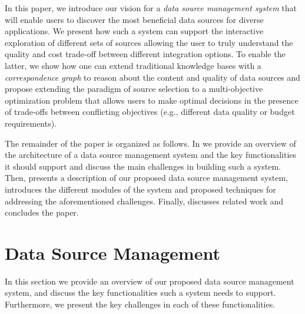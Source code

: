 \documentclass{sig-alternate}
\begin{document}
In this paper, we introduce our vision for a {\em data source management system} that will enable users to discover the most beneficial data sources for diverse applications. We present how such a system can support the interactive exploration of different sets of sources allowing the user to truly understand the quality and cost trade-off between different integration options. To enable the latter, we show how one can extend traditional knowledge bases with a {\em correspondence graph} to reason about the content and quality of data sources and propose extending the paradigm of source selection to a multi-objective optimization problem that allows users to make optimal decisions in the presence of trade-offs between conflicting objectives (e.g., different data quality or budget requirements).

The remainder of the paper is organized as follows. In  we provide an overview of the architecture of a data source management system and the key functionalities it should support and discuss the main challenges in building such a system. Then,  presents a description of our proposed data source management system, introduces the different modules of the system and proposed  techniques for addressing the aforementioned challenges. Finally,  discusses related work and  concludes the paper. 

\section{Data Source Management}
\label{sec:overview}
In this section we provide an overview of our proposed data source management system, and discuss the key functionalities such a system needs to support. Furthermore, we present the key challenges in each of these functionalities.
\end{document}
